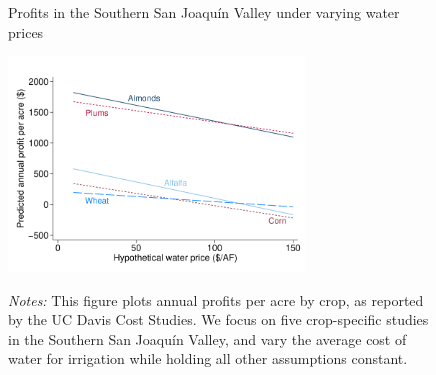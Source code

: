 \begin{figure}[t]
\begin{centering}
\caption{Profits in the Southern San Joaqu\'{i}n Valley under varying water prices}
\label{fig:davis_line_crossing}
\includegraphics[width=0.7\textwidth]{Figures/davis_lines_crossing.pdf}
\caption*{\scriptsize \emph{Notes:} This figure plots annual profits per acre by crop, as reported by the UC Davis Cost Studies. We focus on five crop-specific studies in the Southern San Joaqu\'{i}n Valley, and vary the average cost of water for irrigation while holding all other assumptions constant.}
\end{centering}
\end{figure}
